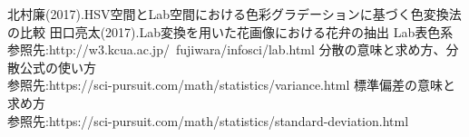 \begin{thebibliography}{9}
北村廉(2017).HSV空間とLab空間における色彩グラデーションに基づく色変換法の比較
田口亮太(2017).Lab変換を用いた花画像における花弁の抽出
Lab表色系\\
参照先:http://w3.kcua.ac.jp/~fujiwara/infosci/lab.html
分散の意味と求め方、分散公式の使い方\\
参照先:https://sci-pursuit.com/math/statistics/variance.html
標準偏差の意味と求め方\\
参照先:https://sci-pursuit.com/math/statistics/standard-deviation.html
\end{thebibliography}
